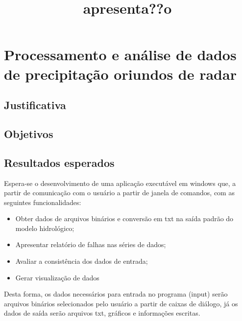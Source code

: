 \documentclass[11pt]{article}
\title{apresenta??o}
\providecommand{\tightlist}{%
      \setlength{\itemsep}{0pt}\setlength{\parskip}{0pt}}
\begin{document}
    
    
    \maketitle
    
    

    
    \hypertarget{processamento-e-anuxe1lise-de-dados-de-precipitauxe7uxe3o-oriundos-de-radar}{%
\section{Processamento e análise de dados de precipitação oriundos de
radar}\label{processamento-e-anuxe1lise-de-dados-de-precipitauxe7uxe3o-oriundos-de-radar}}

    \hypertarget{justificativa}{%
\subsection{Justificativa}\label{justificativa}}

    \hypertarget{objetivos}{%
\subsection{Objetivos}\label{objetivos}}

    \hypertarget{resultados-esperados}{%
\subsection{Resultados esperados}\label{resultados-esperados}}

Espera-se o desenvolvimento de uma aplicação executável em windows que,
a partir de comunicação com o usuário a partir de janela de comandos,
com as seguintes funcionalidades:

\begin{itemize}
\tightlist
\item
  Obter dados de arquivos binários e conversão em txt na saída padrão do
  modelo hidrológico;
\item
  Apresentar relatório de falhas nas séries de dados;
\item
  Avaliar a consistência dos dados de entrada;
\item
  Gerar visualização de dados
\end{itemize}

Desta forma, os dados necessários para entrada no programa (input) serão
arquivos binários selecionados pelo usuário a partir de caixas de
diálogo, já os dados de saída serão arquivos txt, gráficos e informações
escritas.
\end{document}
